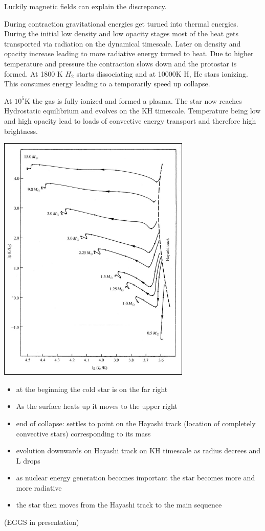 \documentclass[11pt,a4paper]{article}
\begin{document}
Luckily magnetic fields can explain the discrepancy.

During contraction gravitational energies get turned into thermal energies. 
During the initial low density and low opacity stages most of the heat gets transported via radiation on the dynamical timescale. 
Later on density and opacity increase leading to more radiative energy turned to heat. 
Due to higher temperature and pressure the contraction slows down and the protostar is formed.
At 1800 K $H_2$ starts dissociating and at 10000K H, He stars ionizing. 
This consumes energy leading to a temporarily speed up collapse.

At $10^5$K the gas is fully ionized and formed a plasma.
The star now reaches Hydrostatic equilibrium and evolves on the KH timescale.
Temperature being low and high opacity lead to loads of convective energy transport and therefore high brightness.
\begin{center}
    \includegraphics[width=0.5\linewidth]{screenshot_2024-01-21-194512.png}
\end{center}
\begin{itemize}
    \item at the beginning the cold star is on the far right
    \item As the surface heats up it moves to the upper right
    \item end of collapse: settles to point on the
Hayashi track (location of completely convective stars) corresponding to its mass
    \item evolution downwards on Hayashi track on KH timescale as radius decrees and L drops
    \item as nuclear energy generation becomes important the star becomes more and more radiative 
    \item the star then moves from the Hayashi track to the main sequence
\end{itemize}
(EGGS in presentation)
\end{document}
